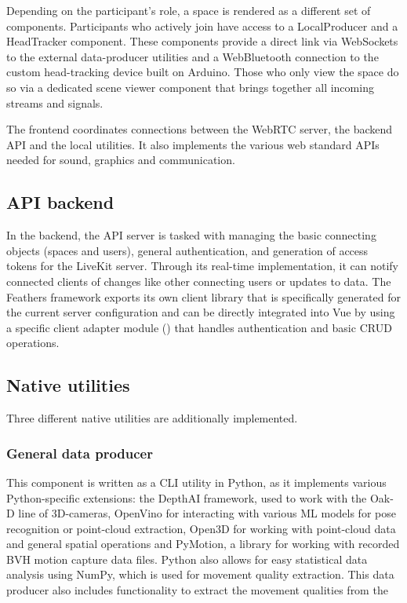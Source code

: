 Depending on the participant's role, a space is rendered as a different set of components.
Participants who actively join have access to a LocalProducer and a HeadTracker component.
These components provide a direct link via WebSockets to the external data-producer utilities and a WebBluetooth connection to the custom head-tracking device built on Arduino.
Those who only view the space do so via a dedicated scene viewer component that brings together all incoming streams and signals.

The frontend coordinates connections between the WebRTC server, the backend \ac{API} and the local utilities.
It also implements the various web standard \ac{API}s needed for sound, graphics and communication.

\subsection{API backend}

In the backend, the \ac{API} server is tasked with managing the basic connecting objects (spaces and users), general authentication, and generation of access tokens for the LiveKit server.
Through its real-time implementation, it can notify connected clients of changes like other connecting users or updates to data.
The Feathers framework exports its own client library that is specifically generated for the current server configuration and can be directly integrated into Vue by using a specific client adapter module () that handles authentication and basic \ac{CRUD} operations.

\subsection{Native utilities}

Three different native utilities are additionally implemented.

\subsubsection{General data producer}

This component is written as a \ac{CLI} utility in Python, as it implements various Python-specific extensions: the DepthAI framework, used to work with the Oak-D line of \ac{3D}-cameras, OpenVino for interacting with various \ac{ML} models for pose recognition or point-cloud extraction, Open3D for working with point-cloud data and general spatial operations and PyMotion, a library for working with recorded \ac{BVH} motion capture data files.
Python also allows for easy statistical data analysis using NumPy, which is used for movement quality extraction.
This data producer also includes functionality to extract the movement qualities from the


